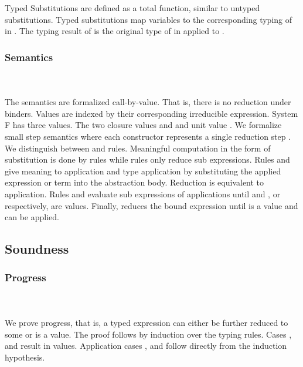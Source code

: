 \noindent Typed Substitutions are defined as a total function, similar to untyped substitutions.
\FSubTyping
Typed substitutions  map variables    to the corresponding typing of  in . The typing result of  is the original type of  in  applied to .
\subsubsection{Semantics}\hfill\\\\
The semantics are formalized call-by-value. That is, there is no reduction under binders. Values are indexed by their corresponding irreducible expression.
\FVal
System F has three values. The two closure values  and  and unit value .
We formalize small step semantics where each constructor represents a single reduction step   .
We distinguish between  and  rules. 
Meaningful computation in the form of substitution is done by  rules while  rules only reduce sub expressions.
\FSemantics
Rules  and  give meaning to application and type application by substituting the applied expression or term into the abstraction body. Reduction  is equivalent to application. Rules  and  evaluate sub expressions of applications until  and , or  respectively, are values. Finally,  reduces the bound expression  until  is a value and  can be applied. 

\subsection{Soundness}

\subsubsection{Progress}\hfill\\\\
We prove progress, that is, a typed expression  can either be further reduced to some  or  is a value. The proof follows by induction over the typing rules. 
\FProgress
Cases ,  and  result in values. Application cases ,  and  follow directly from the induction hypothesis. 
